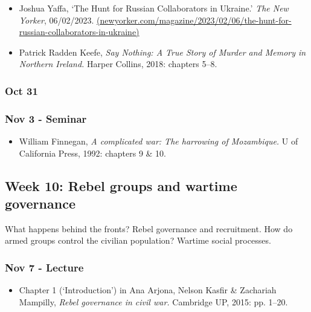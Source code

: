 \documentclass[12pt, a4paper]{article}
\begin{document}
\begin{itemize}
\setlength\itemsep{0pt}
\item Joshua Yaffa, `The Hunt for Russian Collaborators in Ukraine.' \textit{The New Yorker}, 06/02/2023. \href{https://www.newyorker.com/magazine/2023/02/06/the-hunt-for-russian-collaborators-in-ukraine}{(newyorker.com/magazine/2023/02/06/the-hunt-for-russian-collaborators-in-ukraine)}
\item Patrick Radden Keefe, \textit{Say Nothing: A True Story of Murder and Memory in Northern Ireland. }Harper Collins, 2018: chapters 5--8.
\end{itemize}

\subsubsection*{Oct 31 {}}

\subsubsection*{Nov 3 - Seminar}

\begin{itemize}
\setlength\itemsep{0pt}
\item William Finnegan, \textit{A complicated war: The harrowing of Mozambique.} U of California Press, 1992: chapters 9 \& 10.
\end{itemize}

\hline %

\subsection*{Week 10: Rebel groups and wartime governance}

What happens behind the fronts? Rebel governance and recruitment. How do armed groups control the civilian population? Wartime social processes.

\subsubsection*{Nov 7 - Lecture}

\begin{itemize}
\setlength\itemsep{0pt}
\item Chapter 1 (`Introduction') in Ana Arjona, Nelson Kasfir \& Zachariah Mampilly, \textit{Rebel governance in civil war.} Cambridge UP, 2015: pp. 1--20.
\end{itemize}
\end{document}
